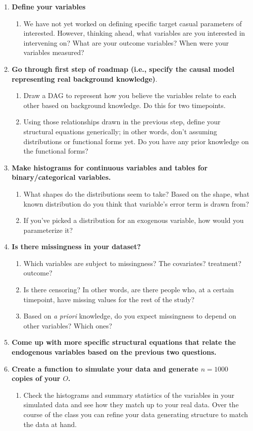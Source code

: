 \documentclass[answers]{exam}
\begin{document}
\begin{enumerate}
\item \textbf{Define your variables} 
\begin{enumerate}
\item We have not yet worked on defining specific target casual parameters of interested. However, thinking ahead, what variables are you interested in intervening on? What are your outcome variables? When were your variables measured? 
\end{enumerate}
\item \textbf{Go through first step of roadmap (i.e., specify the causal model representing real background knowledge)}.
\begin{enumerate}
\item Draw a DAG to represent how you believe the variables relate to each other based on background knowledge. Do this for two timepoints.
\item Using those relationships drawn in the previous step, define your structural equations generically; in other words, don't assuming distributions or functional forms yet. Do you have any prior knowledge on the functional forms?
\end{enumerate}
\item \textbf{Make histograms for continuous variables and tables for binary/categorical variables.}
\begin{enumerate}
\item What shapes do the distributions seem to take? Based on the shape, what known distribution do you think that variable's error term is drawn from?
\item If you've picked a distribution for an exogenous variable, how would you parameterize it?
\end{enumerate}
\item \textbf{Is there missingness in your dataset?}
\begin{enumerate}
\item Which variables are subject to missingness? The covariates? treatment? outcome? 
\item Is there censoring? In other words, are there people who, at a certain timepoint, have missing values for the rest of the study?
\item Based on \textit{a priori} knowledge, do you expect missingness to depend on other variables? Which ones?
\end{enumerate}
\item \textbf{Come up with more specific structural equations that relate the endogenous variables based on the previous two questions.}
\item \textbf{Create a function to simulate your data and generate $n = 1000$ copies of your $O$.}
\begin{enumerate}
\item Check the histograms and summary statistics of the variables in your simulated data and see how they match up to your real data. Over the course of the class you can refine your data generating structure to match the data at hand. 
\end{enumerate}
\end{enumerate}
\end{document}
